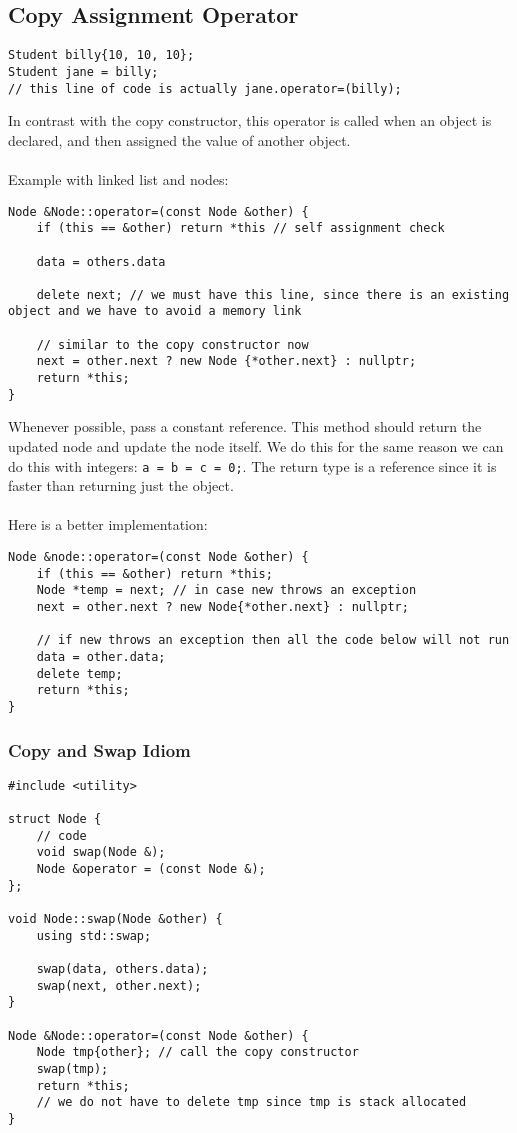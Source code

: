 \documentclass[12pt]{article}
\begin{document}
\subsection{Copy Assignment Operator}
\begin{lstlisting}
Student billy{10, 10, 10};
Student jane = billy;
// this line of code is actually jane.operator=(billy);
\end{lstlisting}
In contrast with the copy constructor, this operator is called when an object is declared, and then assigned the value of another object.\\\\
Example with linked list and nodes:
\begin{lstlisting}
Node &Node::operator=(const Node &other) {
    if (this == &other) return *this // self assignment check
    
    data = others.data
    
    delete next; // we must have this line, since there is an existing object and we have to avoid a memory link
    
    // similar to the copy constructor now
    next = other.next ? new Node {*other.next} : nullptr;
    return *this;
}
\end{lstlisting}
Whenever possible, pass a constant reference. This method should return the updated node and update the node itself. We do this for the same reason we can do this with integers: \lstinline{a = b = c = 0;}. The return type is a reference since it is faster than returning just the object.\\\\
Here is a better implementation:
\begin{lstlisting}
Node &node::operator=(const Node &other) {
    if (this == &other) return *this;
    Node *temp = next; // in case new throws an exception
    next = other.next ? new Node{*other.next} : nullptr;
    
    // if new throws an exception then all the code below will not run
    data = other.data;
    delete temp;
    return *this;
}
\end{lstlisting}

\subsubsection{Copy and Swap Idiom}
\begin{lstlisting}
#include <utility>

struct Node {
    // code
    void swap(Node &);
    Node &operator = (const Node &);
};

void Node::swap(Node &other) {
    using std::swap;
    
    swap(data, others.data);
    swap(next, other.next);
}

Node &Node::operator=(const Node &other) {
    Node tmp{other}; // call the copy constructor
    swap(tmp);
    return *this;
    // we do not have to delete tmp since tmp is stack allocated
}
\end{lstlisting}
\end{document}
